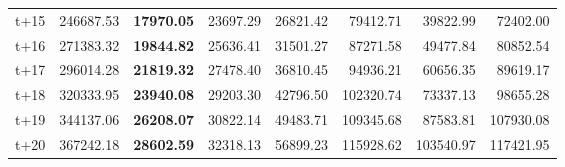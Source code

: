 \begin{table}[H]
\begin{tabular}{lrrrrrrr}
t+15  & 246687.53  & \textbf{17970.05}  & 23697.29  & 26821.42  & 79412.71  & 39822.99  & 72402.00  \\
t+16  & 271383.32  & \textbf{19844.82}  & 25636.41  & 31501.27  & 87271.58  & 49477.84  & 80852.54  \\
t+17  & 296014.28  & \textbf{21819.32}  & 27478.40  & 36810.45  & 94936.21  & 60656.35  & 89619.17  \\
t+18  & 320333.95  & \textbf{23940.08}  & 29203.30  & 42796.50  & 102320.74  & 73337.13  & 98655.28  \\
t+19  & 344137.06  & \textbf{26208.07}  & 30822.14  & 49483.71  & 109345.68  & 87583.81  & 107930.08  \\
t+20  & 367242.18  & \textbf{28602.59}  & 32318.13  & 56899.23  & 115928.62  & 103540.97  & 117421.95  \\

\bottomrule
\end{tabular}
\end{table}
